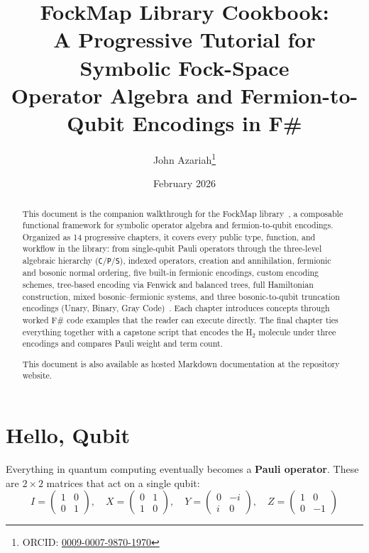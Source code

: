 \documentclass[10pt,a4paper]{article}
\title{FockMap Library Cookbook:\\
  A Progressive Tutorial for Symbolic Fock-Space\\
  Operator Algebra and Fermion-to-Qubit Encodings in F\#}
\author[1]{John Azariah\thanks{ORCID:
  \href{https://orcid.org/0009-0007-9870-1970}{0009-0007-9870-1970}}}
\affil[1]{University of Technology Sydney}
\date{February 2026}
\begin{document}
\maketitle

\begin{abstract}
This document is the companion walkthrough for the FockMap
library~\cite{fockmap2026}, a composable functional framework for
symbolic operator algebra and fermion-to-qubit encodings.  Organized as
14 progressive chapters, it covers every public type, function, and
workflow in the library: from single-qubit Pauli operators through the
three-level algebraic hierarchy (\texttt{C}/\texttt{P}/\texttt{S}),
indexed operators, creation and annihilation, fermionic and bosonic
normal ordering, five built-in fermionic encodings, custom encoding
schemes, tree-based encoding via Fenwick and balanced trees, full
Hamiltonian construction, mixed bosonic--fermionic systems, and three
bosonic-to-qubit truncation encodings (Unary, Binary, Gray
Code)~\cite{sawaya2020}.  Each chapter
introduces concepts through worked F\# code examples that the reader
can execute directly.  The final chapter ties everything together with
a capstone script that encodes the H$_2$ molecule under three encodings
and compares Pauli weight and term count.

This document is also available as hosted Markdown documentation at
the repository website.
\end{abstract}

\tableofcontents
\newpage

\section{Hello, Qubit}\label{ch:hello}

Everything in quantum computing eventually becomes a \textbf{Pauli
operator}.  These are $2\times 2$ matrices that act on a single qubit:
%
\begin{equation}
I = \begin{pmatrix}1&0\\0&1\end{pmatrix},\quad
X = \begin{pmatrix}0&1\\1&0\end{pmatrix},\quad
Y = \begin{pmatrix}0&{-i}\\i&0\end{pmatrix},\quad
Z = \begin{pmatrix}1&0\\0&{-1}\end{pmatrix}
\end{equation}
\end{document}
